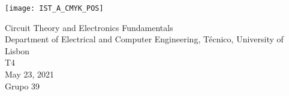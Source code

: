 
\thispagestyle {empty}

\texttt{[image: IST\_A\_CMYK\_POS]}


\begin{center}
  \vspace{1.0cm}

  \vspace{1cm}
  {\FontLb Circuit Theory and Electronics Fundamentals} \\ %
  \vspace{1cm}
  {\FontSn Department of Electrical and Computer Engineering, Técnico, University of Lisbon} \\ %
  \vspace{1cm}
  {\FontSn T4} \\
  \vspace{1cm}
  {\FontSn May 23, 2021} \\
  {\FontSn Grupo 39}
\end{center}

